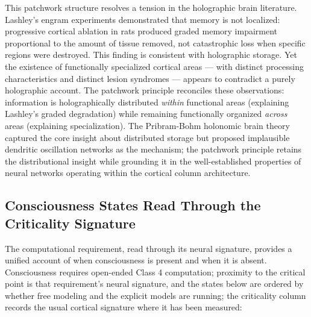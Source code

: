 \documentclass[12pt]{article}
\begin{document}
This patchwork structure resolves a tension in the holographic brain literature. Lashley's engram experiments \citep{Lashley1950} demonstrated that memory is not localized: progressive cortical ablation in rats produced graded memory impairment proportional to the amount of tissue removed, not catastrophic loss when specific regions were destroyed. This finding is consistent with holographic storage. Yet the existence of functionally specialized cortical areas \citep{Brodmann1909} --- with distinct processing characteristics and distinct lesion syndromes --- appears to contradict a purely holographic account. The patchwork principle reconciles these observations: information is holographically distributed \emph{within} functional areas (explaining Lashley's graded degradation) while remaining functionally organized \emph{across} areas (explaining specialization). The Pribram-Bohm holonomic brain theory \citep{Pribram1991} captured the core insight about distributed storage but proposed implausible dendritic oscillation networks as the mechanism; the patchwork principle retains the distributional insight while grounding it in the well-established properties of neural networks operating within the cortical column architecture.


\subsection{Consciousness States Read Through the Criticality Signature}


The computational requirement, read through its neural signature, provides a unified account of when consciousness is present and when it is absent. Consciousness requires open-ended Class 4 computation; proximity to the critical point is that requirement's neural signature, and the states below are ordered by whether free modeling and the explicit models are running; the criticality column records the usual cortical signature where it has been measured:
\end{document}
